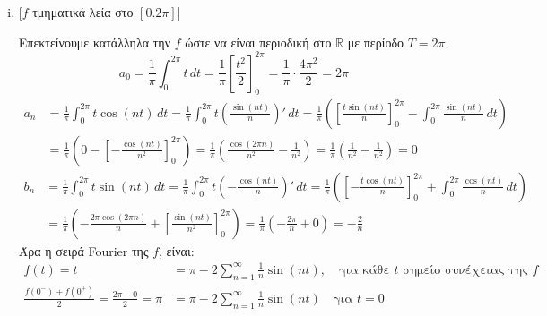 \documentclass[a4paper,table]{report}
\begin{document}
\begin{solution}
\item {}
  \begin{enumerate}[i)]
    \item 
      \begin{minipage}[t]{0.53\textwidth}
        [$f$ τμηματικά λεία στο $ [0.2 \pi] $]
      \end{minipage}

      Επεκτείνουμε κατάλληλα την $f$ ώστε να είναι περιοδική στο $\mathbb{R}$ 
      με περίοδο $ T=2 \pi $.
      \[
        a_{0} = \frac{1}{\pi} \int _{0}^{2 \pi} t\,{dt} = \frac{1}{\pi}
        \left[\frac{t^{2}}{2}\right]_{0}^{2 \pi} = \frac{1}{\pi} \cdot 
        \frac{4 \pi ^{2}}{2} = 2 \pi
      \] 
      \begin{align*}
        a_{n} &= \frac{1}{\pi} \int _{0}^{2 \pi} t \cos{(nt)} \,{dt} = \frac{1}{\pi} 
        \int _{0}^{2 \pi} t \left(\frac{\sin{(nt)}}{n}\right)' \,{dt} = \frac{1}{\pi}
        \left(\left[\frac{t \sin{(nt)}}{n} \right]_{0}^{2 \pi} - \int _{0}^{2 \pi}
        \frac{\sin{(nt)}}{n} \,{dt}\right) \\ 
              &= \frac{1}{\pi} \left(0 - \left[- \frac{\cos{(nt)}}{n^{2}}\right]_{0}^{2 
                \pi}\right) = \frac{1}{\pi} \left(\frac{\cos{(2 \pi n)}}{n^{2}} - 
                  \frac{1}{n^{2}}\right) = \frac{1}{\pi} \left(\frac{1}{n^{2}} - 
                \frac{1}{n^{2}}\right) = 0
      \end{align*} 
      \begin{align*}
        b_{n} &= \frac{1}{\pi} \int _{0}^{2 \pi} t \sin{(nt)} \,{dt} = \frac{1}{\pi} 
        \int _{0}^{2 \pi } t \left(- \frac{\cos{(nt)}}{n}\right)' \,{dt} = \frac{1}{\pi}
        \left(\left[- \frac{t \cos{(nt)}}{n} \right]_{0}^{2 \pi} + \int _{0}^{2 \pi}
        \frac{\cos{(nt)}}{n} \,{dt}\right) \\
              &= \frac{1}{\pi} \left(- \frac{2 \pi \cos{(2 \pi n)}}{n} + \left[
              \frac{\sin{(nt)}}{n^{2}}\right]_{0}^{2 \pi}\right) = 
              \frac{1}{\pi} \left(- \frac{2 \pi}{n} + 0\right) = - \frac{2}{n} 
      \end{align*}
      Άρα η σειρά \textlatin{Fourier} της $f$, είναι:
      \begin{align*}
        f(t) = t &= \pi - 2\sum_{n=1}^{\infty} \frac{1}{n} \sin{(nt)} , 
        \quad \text{για κάθε $t$ σημείο συνέχειας της $f$} \\
        \frac{f(0^{-})+f(0^{+})}{2} = \frac{2 \pi - 0 }{2} = \pi 
                 &= \pi - 2\sum_{n=1}^{\infty} \frac{1}{n} \sin{(nt)} 
                 \quad \text{για $t=0$} 
      \end{align*}


\end{enumerate}
\end{solution}
\end{document}
